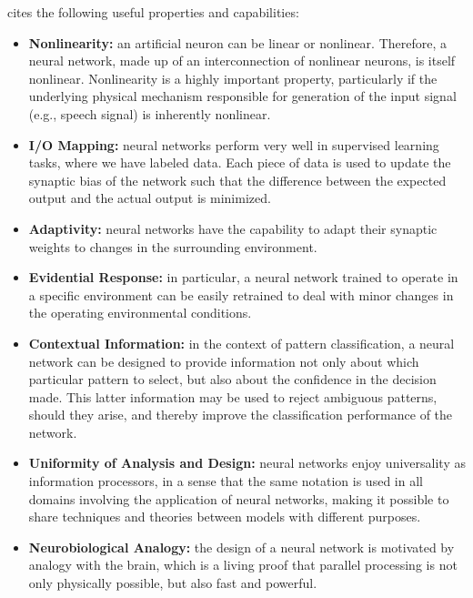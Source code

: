 \cite{haykin2009neural} cites the following useful properties and capabilities:
\begin{itemize}
    \item \textbf{Nonlinearity:} an artificial neuron can be linear or nonlinear. Therefore, a neural network, made up of an interconnection of nonlinear neurons, is itself nonlinear. Nonlinearity is a highly important property, particularly if the underlying physical mechanism responsible for generation of the input signal (e.g., speech signal) is inherently nonlinear.
    \item \textbf{I/O Mapping:} neural networks perform very well in supervised learning tasks, where we have labeled data. Each piece of data is used to update the synaptic bias of the network such that the difference between the expected output and the actual output is minimized.
    \item \textbf{Adaptivity:} neural networks have the capability to adapt their synaptic weights to changes in the surrounding environment. 
    \item \textbf{Evidential Response:} in particular, a neural network trained to operate in a specific environment can be easily retrained to deal with minor changes in the operating environmental conditions.
    \item \textbf{Contextual Information:} in the context of pattern classification, a neural network can be designed to provide information not only about which particular pattern to select, but also about the confidence in the decision made. This latter information may be used to reject ambiguous patterns, should they arise, and thereby improve the classification performance of the network.
    \item \textbf{Uniformity of Analysis and Design:} neural networks enjoy universality as information processors, in a sense that the same notation is used in all domains involving the application of neural networks, making it possible to share techniques and theories between models with different purposes.
    \item \textbf{Neurobiological Analogy:} the design of a neural network is motivated by analogy with the brain, which is a living proof that parallel processing is not only physically possible, but also fast and powerful.
\end{itemize}